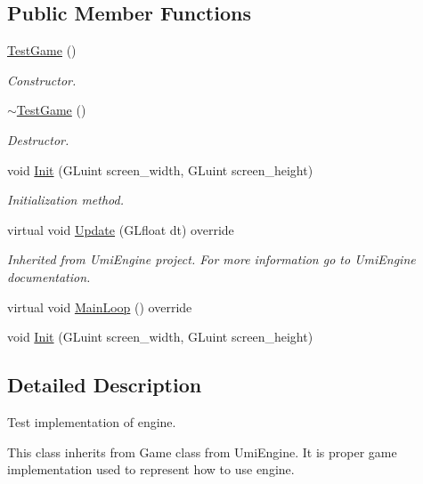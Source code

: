 \subsection*{Public Member Functions}
\begin{DoxyCompactItemize}
\item 
\mbox{\hyperlink{class_test_game_a59adf28e5c02386f31f444e1f85aa80d}{Test\+Game}} ()
\begin{DoxyCompactList}\small\item\em Constructor. \end{DoxyCompactList}\item 
\mbox{\hyperlink{class_test_game_ac0b3267478f7d6ccea98338d3f1dee1a}{$\sim$\+Test\+Game}} ()
\begin{DoxyCompactList}\small\item\em Destructor. \end{DoxyCompactList}\item 
void \mbox{\hyperlink{class_test_game_aabd73405594a1ee0f0d312fe4e1eb237}{Init}} (G\+Luint screen\+\_\+width, G\+Luint screen\+\_\+height)
\begin{DoxyCompactList}\small\item\em Initialization method. \end{DoxyCompactList}\item 
virtual void \mbox{\hyperlink{class_test_game_a3ce3b3807eab3d1753fa4662f8c79df5}{Update}} (G\+Lfloat dt) override
\begin{DoxyCompactList}\small\item\em Inherited from Umi\+Engine project. For more information go to Umi\+Engine documentation. \end{DoxyCompactList}\item 
virtual void \mbox{\hyperlink{class_test_game_a302728c6fe309b522e4f10fcb2f55baf}{Main\+Loop}} () override
\item 
void \mbox{\hyperlink{class_test_game_aabd73405594a1ee0f0d312fe4e1eb237}{Init}} (G\+Luint screen\+\_\+width, G\+Luint screen\+\_\+height)
\end{DoxyCompactItemize}


\subsection{Detailed Description}
Test implementation of engine. 

This class inherits from Game class from Umi\+Engine. It is proper game implementation used to represent how to use engine. 

